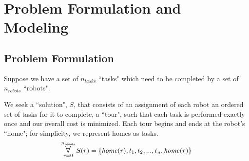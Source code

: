 \documentclass[a4paper]{article}
\newcommand\Forall{\mathop{\mbox{\Large $\mathsurround0pt\forall$}}}
\begin{document}

%

\section{Problem Formulation and Modeling}


%
%


\subsection{Problem Formulation}

Suppose we have a set of $n_\mathit{tasks}$ ``tasks" which need to be completed by a set of $n_\mathit{robots}$ ``robots".

We seek a ``solution", $S$, that consists of an assignment of each robot an ordered set of tasks for it to complete, a ``tour", such that each task is performed exactly once and our overall cost is minimized. Each tour begins and ends at the robot's ``home"; for simplicity, we represent homes as tasks.
$$
\Forall_{r=0}^{n_\mathit{robots}}
S(r) = \{ \mathit{home}(r), t_1, t_2, ..., t_n, \mathit{home}(r) \}
$$
\end{document}
